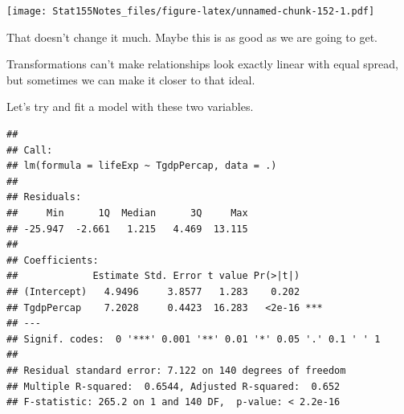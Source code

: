 \documentclass[]{book}
\newenvironment{Shaded}{\begin{snugshade}}{\end{snugshade}}
\newcommand{\DataTypeTok}[1]{\textcolor[rgb]{0.13,0.29,0.53}{#1}}
\newcommand{\DecValTok}[1]{\textcolor[rgb]{0.00,0.00,0.81}{#1}}
\newcommand{\KeywordTok}[1]{\textcolor[rgb]{0.13,0.29,0.53}{\textbf{#1}}}
\newcommand{\NormalTok}[1]{#1}
\newcommand{\OperatorTok}[1]{\textcolor[rgb]{0.81,0.36,0.00}{\textbf{#1}}}
\newcommand{\StringTok}[1]{\textcolor[rgb]{0.31,0.60,0.02}{#1}}
\begin{document}
\begin{Shaded}
\end{Shaded}

\texttt{[image: Stat155Notes\_files/figure-latex/unnamed-chunk-152-1.pdf]}

That doesn't change it much. Maybe this is as good as we are going to get.

Transformations can't make relationships look exactly linear with equal spread, but sometimes we can make it closer to that ideal.

Let's try and fit a model with these two variables.

\begin{Shaded}
\end{Shaded}

\begin{verbatim}
## 
## Call:
## lm(formula = lifeExp ~ TgdpPercap, data = .)
## 
## Residuals:
##     Min      1Q  Median      3Q     Max 
## -25.947  -2.661   1.215   4.469  13.115 
## 
## Coefficients:
##             Estimate Std. Error t value Pr(>|t|)    
## (Intercept)   4.9496     3.8577   1.283    0.202    
## TgdpPercap    7.2028     0.4423  16.283   <2e-16 ***
## ---
## Signif. codes:  0 '***' 0.001 '**' 0.01 '*' 0.05 '.' 0.1 ' ' 1
## 
## Residual standard error: 7.122 on 140 degrees of freedom
## Multiple R-squared:  0.6544, Adjusted R-squared:  0.652 
## F-statistic: 265.2 on 1 and 140 DF,  p-value: < 2.2e-16
\end{verbatim}
\end{document}
